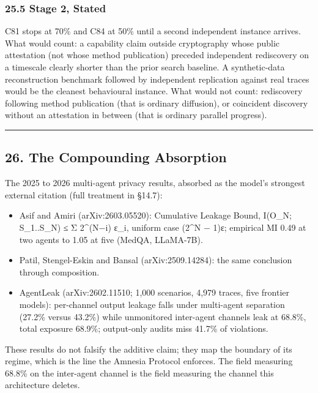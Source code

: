 \documentclass[
  11pt,
]{article}
\providecommand{\tightlist}{%
  \setlength{\itemsep}{0pt}\setlength{\parskip}{0pt}}
\begin{document}
\subsubsection{25.5 Stage 2, Stated}\label{stage-2-stated}

C81 stops at 70\% and C84 at 50\% until a second independent instance
arrives. What would count: a capability claim outside cryptography whose
public attestation (not whose method publication) preceded independent
rediscovery on a timescale clearly shorter than the prior search
baseline. A synthetic-data reconstruction benchmark followed by
independent replication against real traces would be the cleanest
behavioural instance. What would not count: rediscovery following method
publication (that is ordinary diffusion), or coincident discovery
without an attestation in between (that is ordinary parallel progress).

\begin{center}\rule{0.5\linewidth}{0.5pt}\end{center}

\subsection{26. The Compounding
Absorption}\label{the-compounding-absorption}

The 2025 to 2026 multi-agent privacy results, absorbed as the model's
strongest external citation (full treatment in §14.7):

\begin{itemize}
\tightlist
\item
  Asif and Amiri (arXiv:2603.05520): Cumulative Leakage Bound, I(O\_N;
  S\_1..S\_N) ≤ Σ 2\^{}(N−i) ε\_i, uniform case (2\^{}N − 1)ε; empirical
  MI 0.49 at two agents to 1.05 at five (MedQA, LLaMA-7B).
\item
  Patil, Stengel-Eskin and Bansal (arXiv:2509.14284): the same
  conclusion through composition.
\item
  AgentLeak (arXiv:2602.11510; 1,000 scenarios, 4,979 traces, five
  frontier models): per-channel output leakage falls under multi-agent
  separation (27.2\% versus 43.2\%) while unmonitored inter-agent
  channels leak at 68.8\%, total exposure 68.9\%; output-only audits
  miss 41.7\% of violations.
\end{itemize}

These results do not falsify the additive claim; they map the boundary
of its regime, which is the line the Amnesia Protocol enforces. The
field measuring 68.8\% on the inter-agent channel is the field measuring
the channel this architecture deletes.
\end{document}
